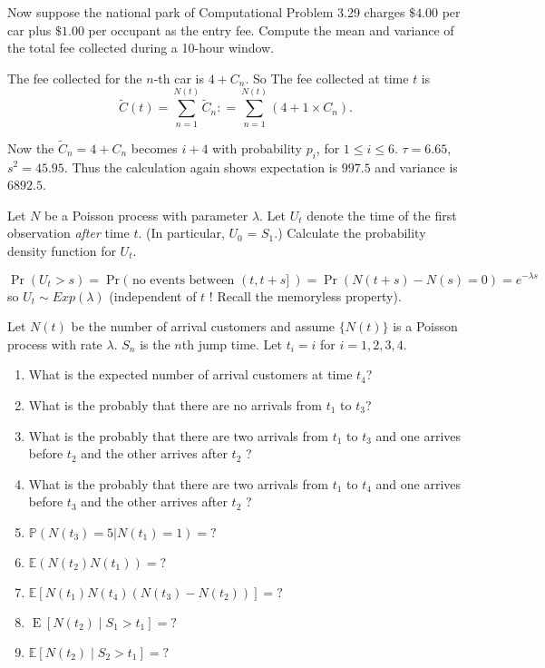\documentclass[  11pt]{article}
\newcommand{\p}{ {\Pr}}
\newcommand{\e}{ \operatorname{E}}
\begin{document}
\begin{ExerciseList}
\Exercise [origin={3.30, p83}] 
Now suppose the national park of Computational Problem 3.29 charges $\$4.00$ per car plus $\$1.00$ per occupant as the entry fee. Compute the mean and variance of the total fee collected during a 10-hour window.

\Answer
The fee collected for the $n$-th car is  $4+ C_n$. So 
The fee collected at time $t$ is 
\[\tilde{C}(t)=\sum_{n=1}^{N(t)} \tilde{C}_n: =\sum_{n=1}^{N(t)} (4+1\times C_n).\]

Now the $\tilde{C}_n=4+C_n$ becomes $i+4$ with probability $p_i$, for $1\le i \le 6$. $\tau = 6.65$, $s^2 = 45.95$. Thus the calculation again shows expectation is $997.5$ and variance is $6892.5$.
 
 \Exercise 
 Let $N$ be a Poisson process with parameter $\lambda$.
Let $U_t$ denote the time of the first observation
{\it after}  time $t$. (In particular, $U_0$ = $S_1$.)
 Calculate the probability density function for $U_t$.
 
\Answer
\[
\p(U_t > s )  =\p ( \text{ no events between } (t, t+s] ~)
= \p  (N(t+s)-N(s)=0  )=e^{-\lambda s }
\]
so $U_t \sim Exp(\lambda)$     (independent of $t$ ! Recall the memoryless property).



 
\Exercise
Let $N(t)$ be the number of arrival customers
and assume $\{N(t)\}$ is  a Poisson process with rate $ \lambda$. $S_n$ is the $n$th jump time.
Let  $t_i = i$ for $i=1,2,3,4$.
\begin{enumerate}
\item  What is the expected number of arrival customers at time $t_4$?
\item  What is the probably that there are no arrivals from $t_1$ to $t_3$?
\item What is the probably that there are two arrivals  from $t_1$ to $t_3$
and one arrives before $t_2$ and the other arrives after $t_2$ ?
\item What is the probably that there are two arrivals  from $t_1$ to $t_4$
and one arrives before $t_3$ and the other arrives after $t_2$ ?
\item $\mathbb{P}(N(t_3) =5|N(t_1) =1)=?$
\item $\mathbb{E}(N(t_2)N(t_1)) = ? $
\item  $\mathbb{E} [N(t_1)N(t_4)(N(t_3) -N(t_2))] = ?$
\item $\e [N(t_2)\mid S_1 > t_1] = ?$
\item $\mathbb{E}[N(t_2) \mid  S_2 >t_1] = ? $
\end{enumerate}



\end{ExerciseList}
\end{document}

